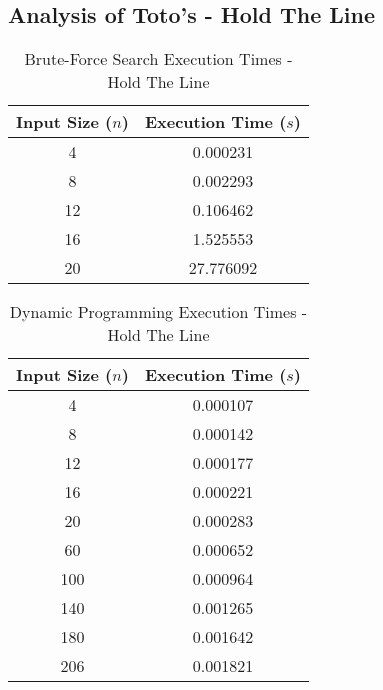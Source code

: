 \documentclass[conference]{IEEEtran}
\begin{document}
\subsection{Analysis of Toto's - Hold The Line}
\begin{table}[H]
    \centering 
    \caption{Brute-Force Search Execution Times - Hold The Line}
    \renewcommand{\arraystretch}{1.2} %
    \setlength{\tabcolsep}{3pt} %
    \begin{tabular}{|c|c|}
        \hline 
        \textbf{Input Size ($n$)} & \textbf{Execution Time ($s$)} \\
        \hline 
        4 & 0.000231 \\
        \hline 
        8 & 0.002293 \\
        \hline 
        12 & 0.106462 \\
        \hline 
        16 & 1.525553 \\
        \hline 
        20 & 27.776092 \\
        \hline
    \end{tabular}
\end{table}

\begin{table}[H]
    \centering
    \caption{Dynamic Programming Execution Times - Hold The Line}
    \renewcommand{\arraystretch}{1.2} %
    \setlength{\tabcolsep}{3pt} %
    \begin{tabular}{|c|c|}
        \hline 
        \textbf{Input Size ($n$)} & \textbf{Execution Time ($s$)} \\
        \hline 
        4 & 0.000107 \\
        \hline 
        8 & 0.000142 \\
        \hline 
        12 & 0.000177 \\
        \hline 
        16 & 0.000221 \\
        \hline 
        20 & 0.000283 \\
        \hline 
        60 & 0.000652 \\
        \hline 
        100 & 0.000964 \\
        \hline
        140 & 0.001265 \\
        \hline
        180 & 0.001642 \\
        \hline
        206 & 0.001821 \\
        \hline
    \end{tabular}
\end{table}
\end{document}
